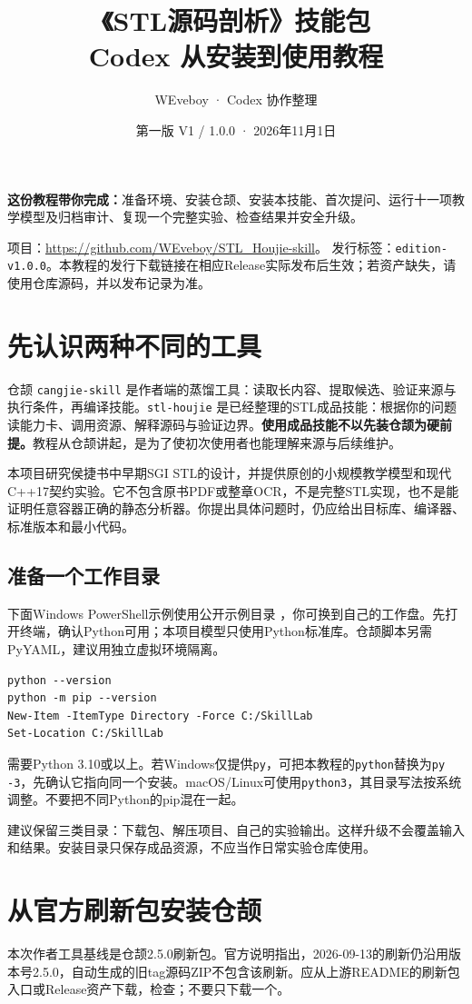 \documentclass[11pt,a4paper,fontset=fandol]{ctexart}
\title{《STL源码剖析》技能包\\Codex 从安装到使用教程}
\author{WEveboy · Codex 协作整理}
\date{第一版 V1 / 1.0.0 · 2026年11月1日}
\begin{document}
\maketitle
\noindent\textbf{这份教程带你完成：}准备环境、安装仓颉、安装本技能、首次提问、运行十一项教学模型及归档审计、复现一个完整实验、检查结果并安全升级。

\noindent 项目：\url{https://github.com/WEveboy/STL_Houjie-skill}。
发行标签：\texttt{edition-v1.0.0}。本教程的发行下载链接在相应Release实际发布后生效；若资产缺失，请使用仓库源码，并以发布记录为准。
{\small\setlength{\parskip}{0pt}\tableofcontents}
\newpage
\section{先认识两种不同的工具}
仓颉 \texttt{cangjie-skill} 是作者端的蒸馏工具：读取长内容、提取候选、验证来源与执行条件，再编译技能。\texttt{stl-houjie} 是已经整理的STL成品技能：根据你的问题读能力卡、调用资源、解释源码与验证边界。\textbf{使用成品技能不以先装仓颉为硬前提。}教程从仓颉讲起，是为了使初次使用者也能理解来源与后续维护。

本项目研究侯捷书中早期SGI STL的设计，并提供原创的小规模教学模型和现代C++17契约实验。它不包含原书PDF或整章OCR，不是完整STL实现，也不是能证明任意容器正确的静态分析器。你提出具体问题时，仍应给出目标库、编译器、标准版本和最小代码。

\subsection{准备一个工作目录}
下面Windows PowerShell示例使用公开示例目录 ，你可换到自己的工作盘。先打开终端，确认Python可用；本项目模型只使用Python标准库。仓颉脚本另需PyYAML，建议用独立虚拟环境隔离。
\begin{lstlisting}
python --version
python -m pip --version
New-Item -ItemType Directory -Force C:/SkillLab
Set-Location C:/SkillLab
\end{lstlisting}
需要Python 3.10或以上。若Windows仅提供\texttt{py}，可把本教程的\texttt{python}替换为\texttt{py -3}，先确认它指向同一个安装。macOS/Linux可使用\texttt{python3}，其目录写法按系统调整。不要把不同Python的pip混在一起。

建议保留三类目录：下载包、解压项目、自己的实验输出。这样升级不会覆盖输入和结果。安装目录只保存成品资源，不应当作日常实验仓库使用。
\section{从官方刷新包安装仓颉}
本次作者工具基线是仓颉2.5.0刷新包。官方说明指出，2026-09-13的刷新仍沿用版本号2.5.0，自动生成的旧tag源码ZIP不包含该刷新。应从上游README的刷新包入口或Release资产下载，检查；不要只下载一个。
\end{document}
